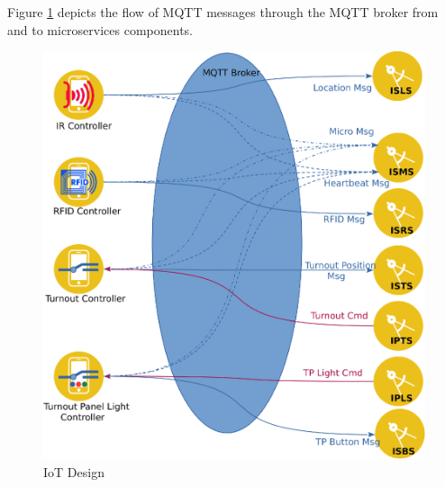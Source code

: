Figure \ref{fig:iotdesign} depicts the flow of \ac{MQTT} messages through the \ac{MQTT} broker from and to microservices components.

\begin{figure}[H]
	\centering
		\includegraphics[scale=0.7]{mqtt-v7.eps}
	\caption{IoT Design}
	\label{fig:iotdesign}
\end{figure}

